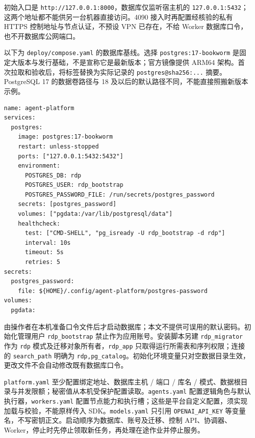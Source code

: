 \documentclass[11pt,a4paper]{article}
\begin{document}
初始入口是 \texttt{http://127.0.0.1:8000}，数据库仅监听宿主机的 \texttt{127.0.0.1:5432}；这两个地址都不能供另一台机器直接访问。4090 接入时再配置经核验的私有 HTTPS 控制地址与节点认证，不预设 VPN 已存在，不给 Worker 数据库口令，也不开数据库公网端口。

以下为 \texttt{deploy/compose.yaml} 的数据库基线。选择 \texttt{postgres:17-bookworm} 是固定大版本与发行基础，不是宣称它是最新版本；官方镜像提供 ARM64 架构。首次拉取和验收后，将标签替换为实际记录的 \texttt{postgres@sha256:...} 摘要。PostgreSQL 17 的数据卷路径与 18 及以后的默认路径不同，不能直接照搬新版本示例。\cite{ch5-postgres-image}
\par\noindent\begin{minipage}{\linewidth}
\begin{lstlisting}
name: agent-platform
services:
  postgres:
    image: postgres:17-bookworm
    restart: unless-stopped
    ports: ["127.0.0.1:5432:5432"]
    environment:
      POSTGRES_DB: rdp
      POSTGRES_USER: rdp_bootstrap
      POSTGRES_PASSWORD_FILE: /run/secrets/postgres_password
    secrets: [postgres_password]
    volumes: ["pgdata:/var/lib/postgresql/data"]
    healthcheck:
      test: ["CMD-SHELL", "pg_isready -U rdp_bootstrap -d rdp"]
      interval: 10s
      timeout: 5s
      retries: 5
secrets:
  postgres_password:
    file: ${HOME}/.config/agent-platform/postgres-password
volumes:
  pgdata:
\end{lstlisting}
\end{minipage}\par


由操作者在本机准备口令文件后才启动数据库；本文不提供可误用的默认密码。初始化管理用户 \texttt{rdp\_bootstrap} 禁止作为应用账号。安装脚本另建 \texttt{rdp\_migrator} 作为 \texttt{rdp} 模式及迁移对象所有者，\texttt{rdp\_app} 只取得运行所需表和序列权限；连接的 \texttt{search\_path} 明确为 \texttt{rdp,pg\_catalog}。初始化环境变量只对空数据目录生效，更改文件不会自动修改既有数据库口令。

\texttt{platform.yaml} 至少配置绑定地址、数据库主机 / 端口 / 库名 / 模式、数据根目录与并发限额；秘密值从本机受保护配置读取。\texttt{agents.yaml} 配置逻辑角色与默认执行器，\texttt{workers.yaml} 配置节点能力和执行槽；这些是平台自定义配置，须实现加载与校验，不能原样传入 SDK。\texttt{models.yaml} 只引用 \texttt{OPENAI\_API\_KEY} 等变量名，不写密钥正文。启动顺序为数据库、账号及迁移、控制 API、协调器、Worker，停止时先停止领取新任务，再处理在途作业并停止服务。
\end{document}
